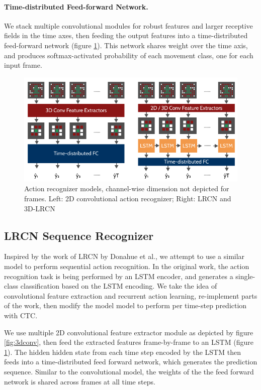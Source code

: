 \documentclass[10pt,twocolumn,letterpaper]{article}
\begin{document}
\paragraph{Time-distributed Feed-forward Network.}

We stack multiple convolutional modules for robust features and larger receptive fields in the time axes, then feeding the output features into a time-distributed feed-forward network (figure \ref{fig:armodels}). This network shares weight over the time axis, and produces softmax-activated probability of each movement class, one for each input frame. 

\begin{figure}[]
    \centering
    \includegraphics[scale=0.35]{ar-models.png}
    \caption{Action recognizer models, channel-wise dimension not depicted for frames. Left: 2D convolutional action recognizer; Right: LRCN and 3D-LRCN}
    \label{fig:armodels}
\end{figure}

\subsection{LRCN Sequence Recognizer}

Inspired by the work of LRCN by Donahue et al.\cite{lrcn}, we attempt to use a similar model to perform sequential action recognition. In the original work, the action recognition task is being performed by an LSTM encoder, and generates a single-class classification based on the LSTM encoding. We take the idea of convolutional feature extraction and recurrent action learning, re-implement parts of the work, then modify the model model to perform per time-step prediction with CTC.

We use multiple 2D convolutional feature extractor module as depicted by figure \ref{fig:3dconv}, then feed the extracted features frame-by-frame to an LSTM (figure \ref{fig:armodels}). The hidden hidden state from each time step encoded by the LSTM then feeds into a time-distributed feed forward network, which generates the prediction sequence. Similar to the convolutional model, the weights of the the feed forward network is shared across frames at all time steps.
\end{document}
